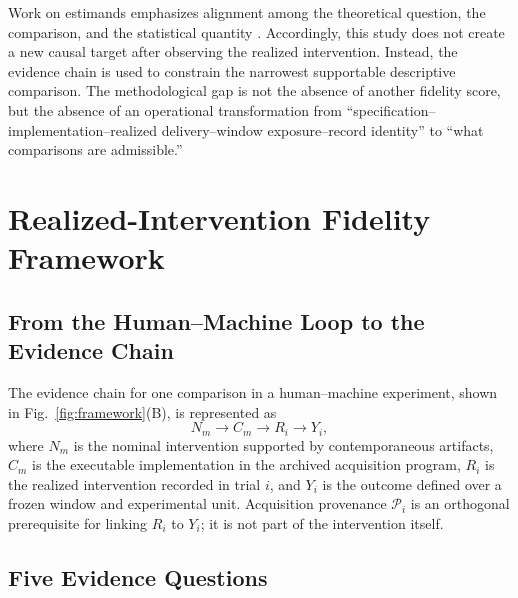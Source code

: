 \documentclass[journal]{IEEEtran}
\begin{document}
Work on estimands emphasizes alignment among the theoretical question, the
comparison, and the statistical quantity \cite{lundberg2021}. Accordingly,
this study does not create a new causal target after observing the realized
intervention. Instead, the evidence chain is used to constrain the narrowest
supportable descriptive comparison. The methodological gap is not the absence
of another fidelity score, but the absence of an operational transformation
from ``specification--implementation--realized delivery--window
exposure--record identity'' to ``what comparisons are admissible.''

\section{Realized-Intervention Fidelity Framework}

\subsection{From the Human--Machine Loop to the Evidence Chain}

The evidence chain for one comparison in a human--machine experiment, shown
in Fig.~\ref{fig:framework}(B), is represented as
\begin{equation}
N_m\rightarrow C_m\rightarrow R_i\rightarrow Y_i,
\label{eq:evidence_chain}
\end{equation}
where $N_m$ is the nominal intervention supported by contemporaneous
artifacts, $C_m$ is the executable implementation in the archived acquisition
program, $R_i$ is the realized intervention recorded in trial $i$, and $Y_i$
is the outcome defined over a frozen window and experimental unit. Acquisition
provenance $\mathcal{P}_i$ is an orthogonal prerequisite for linking $R_i$ to
$Y_i$; it is not part of the intervention itself.

\subsection{Five Evidence Questions}
\end{document}
